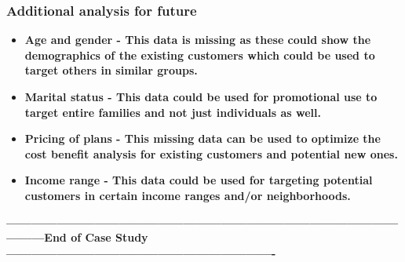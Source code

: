 \documentclass[
]{article}
\begin{document}
\hypertarget{additional-analysis-for-future}{%
\subsubsection{\texorpdfstring{\textbf{Additional analysis for
future}}{Additional analysis for future}}\label{additional-analysis-for-future}}

\begin{itemize}
\item
  \textbf{Age and gender - This data is missing as these could show the
  demographics of the existing customers which could be used to target
  others in similar groups.}
\item
  \textbf{Marital status - This data could be used for promotional use
  to target entire families and not just individuals as well.}
\item
  \textbf{Pricing of plans - This missing data can be used to optimize
  the cost benefit analysis for existing customers and potential new
  ones.}
\item
  \textbf{Income range - This data could be used for targeting potential
  customers in certain income ranges and/or neighborhoods.}
\end{itemize}

\textbf{------------------------------------------------------------------------------------------------------End
of Case
Study----------------------------------------------------------------}
\end{document}
